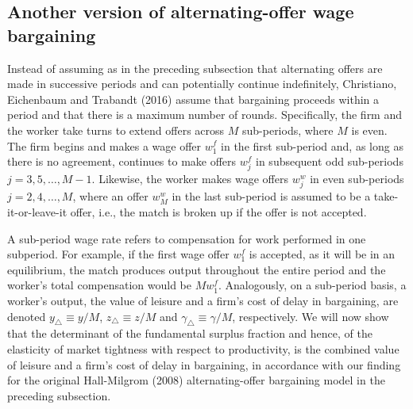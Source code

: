 \subsection{Another version of alternating-offer wage bargaining}\label{sec:CET_AOB}%
Instead of assuming as in the preceding subsection that
alternating offers are made in successive periods and can
potentially continue indefinitely, Christiano, Eichenbaum and
Trabandt (2016) assume that bargaining proceeds within a
period and that there is a maximum number of rounds. 
Specifically, the firm and the worker take turns to extend 
offers across $M$ sub-periods, where $M$ is even. The firm 
begins and makes a wage offer $w^f_1$ in the first 
sub-period and, as long as there is no agreement,
continues to make offers $w^f_j$ in subsequent odd 
sub-periods $j=3,5,\ldots, M-1$. Likewise, the worker makes 
wage offers $w^w_j$ in even sub-periods $j=2,4, \ldots, M$, 
where an offer $w^w_M$ in the last sub-period is assumed to
be a take-it-or-leave-it offer, i.e., the match is broken up 
if the offer is not accepted.

%

A sub-period wage rate refers to compensation for work
performed in one subperiod. For example, if the first
wage offer $w^f_1$ is accepted, as it will be in an 
equilibrium, the match produces output throughout the 
entire period and the worker's total compensation would 
be $M w^f_1$. Analogously, on a 
sub-period basis, a worker's output, the value of leisure 
and a firm's cost of delay in bargaining, are denoted   
$y_\triangle \equiv y/M$, $z_\triangle \equiv z/M$ 
and $\gamma_\triangle \equiv \gamma /M$, respectively.
We will now show that the determinant of the fundamental 
surplus fraction and hence, of the elasticity of market 
tightness with 
respect to productivity, is the combined value of leisure 
and a firm's cost of delay in bargaining, in accordance with 
our finding for the original Hall-Milgrom (2008) 
alternating-offer bargaining model in the preceding 
subsection.

